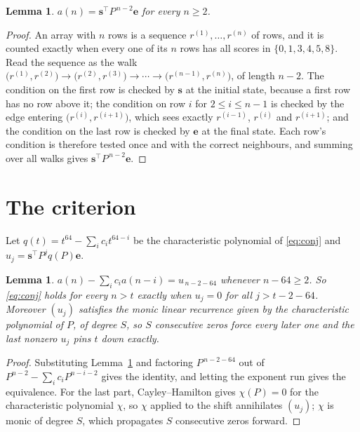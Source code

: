 \documentclass[11pt,a4paper]{article}
\theoremstyle{plain}
\newtheorem{lemma}[theorem]{Lemma}
\theoremstyle{definition}
\begin{document}
\begin{lemma}\label{lem:walk}
$a(n)=\mathbf{s}^{\!\top}P^{\,n-2}\mathbf{e}$ for every $n\ge2$.
\end{lemma}

\begin{proof}
An array with $n$ rows is a sequence $r^{(1)},\dots,r^{(n)}$ of rows, and it is counted
exactly when every one of its $n$ rows has all scores in $\{0,1,3,4,5,8\}$. Read the sequence as the
walk $\bigl(r^{(1)},r^{(2)}\bigr)\to\bigl(r^{(2)},r^{(3)}\bigr)\to\cdots\to
\bigl(r^{(n-1)},r^{(n)}\bigr)$, of length $n-2$. The condition on the first row is
checked by $\mathbf{s}$ at the initial state, because a first row has no row above it; the
condition on row $i$ for $2\le i\le n-1$ is checked by the edge entering
$\bigl(r^{(i)},r^{(i+1)}\bigr)$, which sees exactly $r^{(i-1)}$, $r^{(i)}$ and
$r^{(i+1)}$; and the condition on the last row is checked by $\mathbf{e}$ at the final
state. Each row's condition is therefore tested once and with the correct neighbours, and
summing over all walks gives $\mathbf{s}^{\!\top}P^{\,n-2}\mathbf{e}$.
\end{proof}

\section{The criterion}

Let $q(t)=t^{64}-\sum_i c_i t^{64-i}$ be the characteristic polynomial of
\eqref{eq:conj} and $u_j=\mathbf{s}^{\!\top}P^{j}q(P)\mathbf{e}$.

\begin{lemma}\label{lem:crit}
$a(n)-\sum_i c_i a(n-i)=u_{\,n-2-64}$ whenever $n-64\ge2$. So \eqref{eq:conj}
holds for every $n>t$ exactly when $u_j=0$ for all $j>t-2-64$. Moreover $(u_j)$
satisfies the monic linear recurrence given by the characteristic polynomial of $P$, of
degree $S$, so $S$ consecutive zeros force every later one and the last nonzero $u_j$ pins
$t$ down exactly.
\end{lemma}

\begin{proof}
Substituting Lemma~\ref{lem:walk} and factoring $P^{\,n-2-64}$ out of
$P^{n-2}-\sum_i c_i P^{n-i-2}$ gives the identity, and letting the exponent run gives the
equivalence. For the last part, Cayley--Hamilton gives $\chi(P)=0$ for the characteristic
polynomial $\chi$, so $\chi$ applied to the shift annihilates $(u_j)$; $\chi$ is monic of
degree $S$, which propagates $S$ consecutive zeros forward.
\end{proof}
\end{document}
